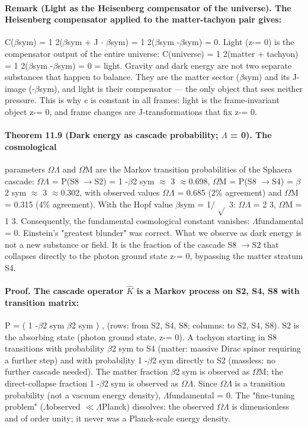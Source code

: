 \paragraph*{Remark (Light as the Heisenberg compensator of the universe). The Heisenberg compensator applied to the matter-tachyon pair gives:}
C($\beta$sym) = 1 2($\beta$sym + J $\cdot$ $\beta$sym) = 1 2($\beta$sym -$\beta$sym) = 0.
Light (z-= 0) is the compensator output of the entire universe: C(universe) = 1 2(matter + tachyon) = 1 2($\beta$sym -$\beta$sym) = 0 = light. Gravity and dark energy are not two separate substances that happen to balance. They are the matter sector ($\beta$sym) and its J-image (-$\beta$sym), and light is their compensator --- the only object that sees neither pressure. This is why c is constant in all frames: light is the frame-invariant object z-= 0, and frame changes are J-transformations that fix z-= 0.
\paragraph*{Theorem 11.9 (Dark energy as cascade probability; $\Lambda$ = 0). The cosmological}
parameters $\Omega$$\Lambda$ and $\Omega$M are the Markov transition probabilities of the Sphaera cascade: $\Omega$$\Lambda$ = P(S8 $\to$S2) = 1 -$\beta$2 sym $\approx$ 3 $\approx$0.698, $\Omega$M = P(S8 $\to$S4) = $\beta$2 sym $\approx$ 3 $\approx$0.302, with observed values $\Omega$$\Lambda$ = 0.685 (2\% agreement) and $\Omega$M = 0.315 (4\% agreement). With the Hopf value $\beta$sym = 1/ $\sqrt{}$ 3: $\Omega$$\Lambda$ = 2 3, $\Omega$M = 1
3.
Consequently, the fundamental cosmological constant vanishes: $\Lambda$fundamental =
0. Einstein's "greatest blunder" was correct.
What we observe as dark energy is not a new substance or field. It is the fraction of the cascade S8 $\to$S2 that collapses directly to the photon ground state z-= 0, bypassing the matter stratum S4.
\paragraph*{Proof. The cascade operator $\hat K$ is a Markov process on {S2, S4, S8} with transition matrix:}
P = (
1 -$\beta$2 sym $\beta$2 sym )
, (rows: from S2, S4, S8; columns: to S2, S4, S8). S2 is the absorbing state (photon ground state, z-= 0). A tachyon starting in S8 transitions with probability $\beta$2 sym to S4 (matter: massive Dirac spinor requiring a further step) and with probability 1 -$\beta$2 sym directly to S2 (massless: no further cascade needed). The matter fraction $\beta$2 sym is observed as $\Omega$M; the direct-collapse fraction 1 -$\beta$2 sym is observed as $\Omega$$\Lambda$. Since $\Omega$$\Lambda$ is a transition probability (not a vacuum energy density), $\Lambda$fundamental = 0. The "fine-tuning problem" ($\Lambda$observed $\ll$$\Lambda$Planck) dissolves: the
observed $\Omega$$\Lambda$ is dimensionless and of order unity; it never was a Planck-scale energy density.
